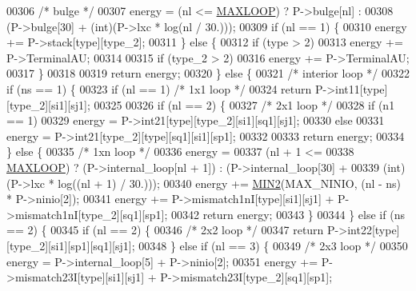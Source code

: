 \begin{DoxyCode}
00306     \textcolor{comment}{/* bulge */}
00307     energy = (nl <= \hyperlink{energy__const_8h_ad1bd6eabac419670ddd3c9ed82145988}{MAXLOOP}) ? P->bulge[nl] :
00308              (P->bulge[30] + (\textcolor{keywordtype}{int})(P->lxc * log(nl / 30.)));
00309     \textcolor{keywordflow}{if} (nl == 1) \{
00310       energy += P->stack[type][type\_2];
00311     \} \textcolor{keywordflow}{else} \{
00312       \textcolor{keywordflow}{if} (type > 2)
00313         energy += P->TerminalAU;
00314 
00315       \textcolor{keywordflow}{if} (type\_2 > 2)
00316         energy += P->TerminalAU;
00317     \}
00318 
00319     \textcolor{keywordflow}{return} energy;
00320   \} \textcolor{keywordflow}{else} \{
00321     \textcolor{comment}{/* interior loop */}
00322     \textcolor{keywordflow}{if} (ns == 1) \{
00323       \textcolor{keywordflow}{if} (nl == 1)                    \textcolor{comment}{/* 1x1 loop */}
00324         \textcolor{keywordflow}{return} P->int11[type][type\_2][si1][sj1];
00325 
00326       \textcolor{keywordflow}{if} (nl == 2) \{
00327         \textcolor{comment}{/* 2x1 loop */}
00328         \textcolor{keywordflow}{if} (n1 == 1)
00329           energy = P->int21[type][type\_2][si1][sq1][sj1];
00330         \textcolor{keywordflow}{else}
00331           energy = P->int21[type\_2][type][sq1][si1][sp1];
00332 
00333         \textcolor{keywordflow}{return} energy;
00334       \} \textcolor{keywordflow}{else} \{
00335         \textcolor{comment}{/* 1xn loop */}
00336         energy =
00337           (nl + 1 <=
00338            \hyperlink{energy__const_8h_ad1bd6eabac419670ddd3c9ed82145988}{MAXLOOP}) ? (P->internal\_loop[nl + 1]) : (P->internal\_loop[30] +
00339                                                     (int)(P->lxc * log((nl + 1) / 30.)));
00340         energy  += \hyperlink{group__utils_gae0b9cd0ce090bd69b951aa73e8fa4f7d}{MIN2}(MAX\_NINIO, (nl - ns) * P->ninio[2]);
00341         energy  += P->mismatch1nI[type][si1][sj1] + P->mismatch1nI[type\_2][sq1][sp1];
00342         \textcolor{keywordflow}{return} energy;
00343       \}
00344     \} \textcolor{keywordflow}{else} \textcolor{keywordflow}{if} (ns == 2) \{
00345       \textcolor{keywordflow}{if} (nl == 2) \{
00346         \textcolor{comment}{/* 2x2 loop */}
00347         \textcolor{keywordflow}{return} P->int22[type][type\_2][si1][sp1][sq1][sj1];
00348       \} \textcolor{keywordflow}{else} \textcolor{keywordflow}{if} (nl == 3) \{
00349         \textcolor{comment}{/* 2x3 loop */}
00350         energy  = P->internal\_loop[5] + P->ninio[2];
00351         energy  += P->mismatch23I[type][si1][sj1] + P->mismatch23I[type\_2][sq1][sp1];

\end{DoxyCode}
